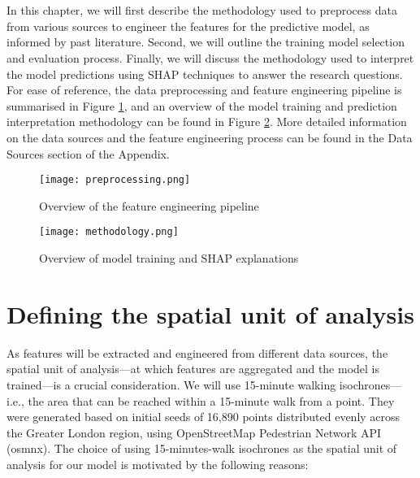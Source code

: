 \section*{}

In this chapter, we will first describe the methodology used to preprocess data from various sources to engineer the features for the predictive model, as informed by past literature. Second, we will outline the training model selection and evaluation process. Finally, we will discuss the methodology used to interpret the model predictions using SHAP techniques to answer the research questions. For ease of reference, the data preprocessing and feature engineering pipeline is summarised in Figure \ref{fig:preprocessing}, and an overview of the model training and prediction interpretation methodology can be found in Figure \ref{fig:methodology}. More detailed information on the data sources and the feature engineering process can be found in the Data Sources section of the Appendix.

\begin{figure}[!ht]
    \centering
    \texttt{[image: preprocessing.png]}
    \caption{Overview of the feature engineering pipeline}
    \label{fig:preprocessing}
\end{figure}

\begin{figure}[!ht]
    \centering
    \texttt{[image: methodology.png]}
    \caption{Overview of model training and SHAP explanations}
    \label{fig:methodology}
\end{figure}

\pagebreak %
\section{Defining the spatial unit of analysis}

As features will be extracted and engineered from different data sources, the spatial unit of analysis---at which features are aggregated and the model is trained---is a crucial consideration. We will use 15-minute walking isochrones---i.e., the area that can be reached within a 15-minute walk from a point. They were generated based on initial seeds of 16,890 points distributed evenly across the Greater London region, using OpenStreetMap Pedestrian Network API (osmnx). The choice of using 15-minutes-walk isochrones as the spatial unit of analysis for our model is motivated by the following reasons: 

